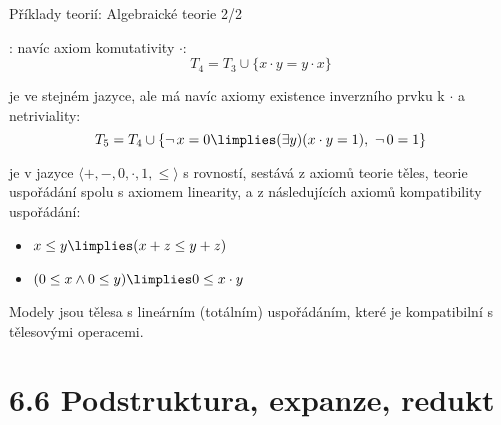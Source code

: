 \documentclass{beamer}
\begin{document}
\begin{frame}{Příklady teorií: Algebraické teorie 2/2}
    
    \pause
    : navíc axiom \alert{komutativity $\cdot$}:
    \pause
    {\small
    $$
    T_4 = T_3 \cup \{x \cdot y = y \cdot x\}
    $$
    }
    
    \pause
     je ve stejném jazyce, ale má navíc axiomy \alert{existence inverzního prvku k $\cdot$} a \alert{netriviality}:
    \pause
    {\small
    $$
    T_5 = T_4 \cup \{\neg\,x=0 \limplies (\exists y)(x\cdot y = 1),\ \neg\,0=1\}
    $$
    }

    \pause
     je v jazyce $\langle +, -, 0,\cdot,1,\leq\rangle$ s rovností, sestává z axiomů teorie těles, teorie uspořádání spolu s axiomem linearity, a z následujících axiomů \alert{kompatibility uspořádání}: 

    \begin{itemize}
        \item $x\leq y\limplies (x+z\leq y+z)$
        \item $(0\leq x\land 0\leq y)\limplies 0\leq x\cdot y$
    \end{itemize}

    \pause
    Modely jsou tělesa s \alert{lineárním (totálním)} uspořádáním, které je kompatibilní s tělesovými operacemi.

\end{frame}


\section{6.6 Podstruktura, expanze, redukt}
\end{document}
